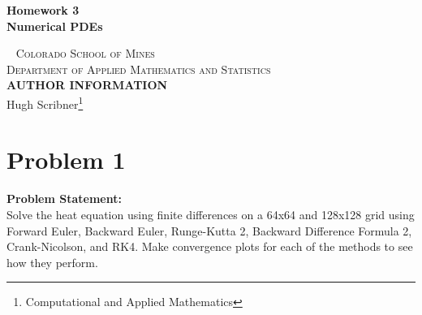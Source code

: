 \documentclass[12pt]{article}
\begin{document}
\newpage
\newpage
\newtheorem{theorem}{Theorem}

\begin{titlepage}

    \begin{center}
        \vspace*{2.5in}
            \huge
            \textbf{{Homework 3}}\\
            \large
            \textbf{Numerical PDEs}\\
    \end{center}
    ~\vfill
    \noindent \textsc{Colorado School of Mines}\\
    \textsc{Department of Applied Mathematics and Statistics}\\
    
    \vspace{1cm}
    \noindent \textsc{\textbf{AUTHOR INFORMATION}}\\
    \noindent Hugh Scribner\footnote{Computational and Applied Mathematics}\\ 
    \vspace{1mm}
    
\end{titlepage}

\newpage

\tableofcontents

\newpage

\newpage
\section{Problem 1}
 \begin{tcolorbox}
        \textbf{Problem Statement:}\\
        Solve the heat equation using finite differences on a 64x64 and 128x128 grid using Forward Euler, Backward Euler, Runge-Kutta 2, Backward Difference Formula 2, Crank-Nicolson, and RK4. Make convergence plots for each of the methods to see how they perform.
    \end{tcolorbox}
    
\end{document}

